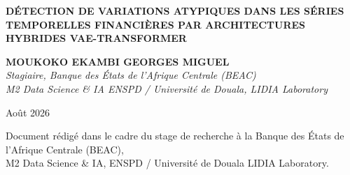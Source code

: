 \documentclass[12pt,a4paper]{article}
\begin{document}
\begin{titlepage}
\centering
\vspace*{2cm}

{\LARGE\bfseries
DÉTECTION DE VARIATIONS ATYPIQUES DANS LES SÉRIES TEMPORELLES
FINANCIÈRES PAR ARCHITECTURES HYBRIDES VAE-TRANSFORMER \\[0.4em]
}

\vspace{2cm}

{\large\bfseries MOUKOKO EKAMBI GEORGES MIGUEL}\\[0.5em]
{\normalsize\itshape
Stagiaire, Banque des États de l'Afrique Centrale (BEAC)\\
M2 Data Science \& IA  ENSPD / Université de Douala, LIDIA Laboratory
}

\vspace{2cm}

{\normalsize Août 2026}

\vfill

{\small
Document rédigé dans le cadre du stage de recherche à la Banque des États de l'Afrique Centrale (BEAC),\\
M2 Data Science \& IA, ENSPD / Université de Douala  LIDIA Laboratory.
}
\end{titlepage}

\begin{abstract}
La détection non supervisée de variations atypiques dans des séries temporelles financières multivariées constitue un problème fondamental pour la surveillance macroprudentielle. Ce document présente un état de l'art exhaustif des architectures d'intelligence artificielle mobilisées à cette fin, depuis les fondations théoriques du cadre variationnel (Kingma \& Welling, 2013 ; An \& Cho, 2015) jusqu'aux hybrides VAE-Transformer les plus récents (T-VAE, 2025 ; SHAPAttenVAE, 2025 ; MAAT, 2025). Chaque contribution est analysée en profondeur sur ses fondements mathématiques, son architecture, sa fonction objectif, ses résultats expérimentaux et ses limites structurelles. Une cartographie transversale identifie trois lacunes non résolues dans la littérature : l'absence d'encodage bidirectionnel dans les espaces latents hybrides, la quantification incomplète de l'incertitude dans les scores d'anomalie, et l'absence d'un score hiérarchique multi-niveaux explicable. Ces lacunes définissent le terrain de contribution d'une nouvelle méthode adaptée au contexte des données monétaires BEAC-CEMAC.

\bigskip
\noindent\textbf{Mots-clés :} détection d'anomalies, séries temporelles multivariées, autoencodeur variationnel, Transformer, Association Discrepancy, ELBO, BEAC, surveillance macroprudentielle.
\end{abstract}
\end{document}
